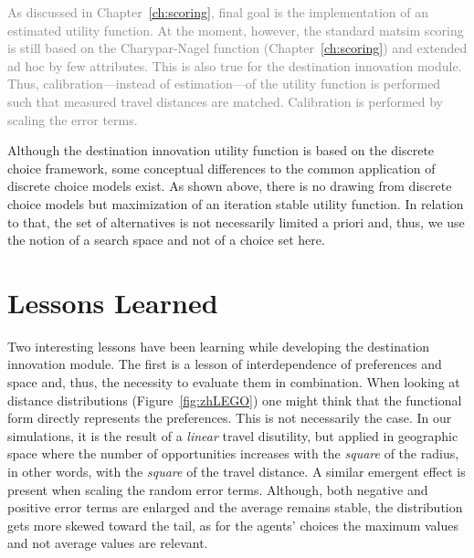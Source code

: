 \textcolor{gray}{\tiny As discussed in Chapter~\ref{ch:scoring}, final goal is the implementation of an estimated utility function. 
At the moment, however, the standard \gls{matsim} scoring is still based on the Charypar-Nagel function (Chapter~\ref{ch:scoring}) and extended ad hoc by few attributes. 
This is also true for the destination innovation module. 
Thus, calibration---instead of estimation---of the utility function is performed such that measured travel distances are matched. 
Calibration is performed by scaling the error terms.} 

Although the destination innovation utility function is based on the discrete choice framework, some conceptual differences to the common application of discrete choice models exist. 
As shown above, there is no drawing from discrete choice models but maximization of an iteration stable utility function. 
In relation to that, the set of alternatives is not necessarily limited a priori and, thus, we use the notion of a search space and not of a choice set here.

\section{Lessons Learned}
Two interesting lessons have been learning while developing the destination innovation module. 
The first is a lesson of interdependence of preferences and space and,  thus, the necessity to evaluate them in combination. 
When looking at distance distributions (\eg Figure~\ref{fig:zhLEGO}) one might think that the functional form directly represents the preferences. 
This is not necessarily the case. 
In our simulations, it is the result of a \emph{linear} travel disutility, but applied in geographic space where the number of opportunities increases with the \emph{square} of the radius, in other words, with the \emph{square} of the travel distance. 
A similar emergent effect is present when scaling the random error terms. 
Although, both negative and positive error terms are enlarged and the average remains stable, the distribution gets more skewed toward the tail, as for the agents' choices the maximum values and not average values are relevant.

